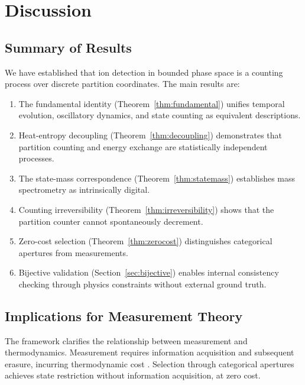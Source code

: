 \section{Discussion}
\label{sec:discussion}

\subsection{Summary of Results}

We have established that ion detection in bounded phase space is a counting process over discrete partition coordinates. The main results are:

\begin{enumerate}
    \item The fundamental identity (Theorem~\ref{thm:fundamental}) unifies temporal evolution, oscillatory dynamics, and state counting as equivalent descriptions.

    \item Heat-entropy decoupling (Theorem~\ref{thm:decoupling}) demonstrates that partition counting and energy exchange are statistically independent processes.

    \item The state-mass correspondence (Theorem~\ref{thm:statemass}) establishes mass spectrometry as intrinsically digital.

    \item Counting irreversibility (Theorem~\ref{thm:irreversibility}) shows that the partition counter cannot spontaneously decrement.

    \item Zero-cost selection (Theorem~\ref{thm:zerocost}) distinguishes categorical apertures from measurements.

    \item Bijective validation (Section~\ref{sec:bijective}) enables internal consistency checking through physics constraints without external ground truth.
\end{enumerate}

\subsection{Implications for Measurement Theory}

The framework clarifies the relationship between measurement and thermodynamics. Measurement requires information acquisition and subsequent erasure, incurring thermodynamic cost \citep{bennett1982}. Selection through categorical apertures achieves state restriction without information acquisition, at zero cost.


